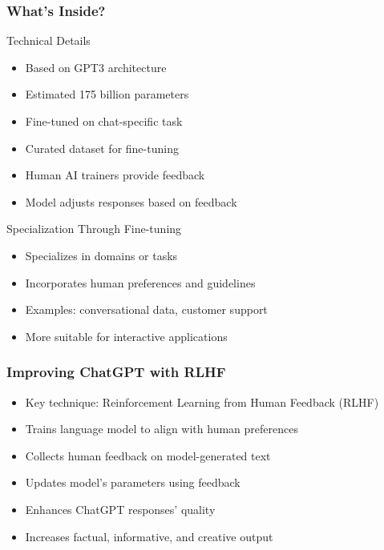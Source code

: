 \begin{frame}[fragile]\frametitle{What's Inside?}
Technical Details
    \begin{itemize}
        \item Based on GPT3 architecture
        \item Estimated 175 billion parameters
        \item Fine-tuned on chat-specific task
        \item Curated dataset for fine-tuning
        \item Human AI trainers provide feedback
        \item Model adjusts responses based on feedback
    \end{itemize}
	
Specialization Through Fine-tuning

    \begin{itemize}
        \item Specializes in domains or tasks
        \item Incorporates human preferences and guidelines
        \item Examples: conversational data, customer support
        \item More suitable for interactive applications
    \end{itemize}
\end{frame}

\begin{frame}[fragile]\frametitle{Improving ChatGPT with RLHF}
    \begin{itemize}
        \item Key technique: Reinforcement Learning from Human Feedback (RLHF)
        \item Trains language model to align with human preferences
        \item Collects human feedback on model-generated text
        \item Updates model's parameters using feedback
        \item Enhances ChatGPT responses' quality
        \item Increases factual, informative, and creative output
    \end{itemize}
\end{frame}


